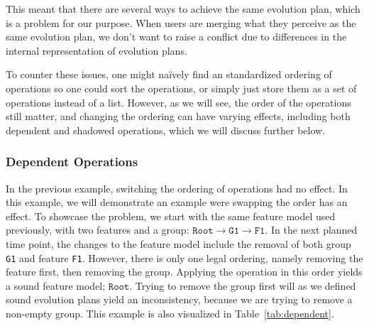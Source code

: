 \documentclass[a4paper,english]{ifimaster}
\begin{document}
This meant that there are several ways to achieve the same evolution plan, which is a problem for our purpose. When users are merging what they perceive as the same evolution plan, we don't want to raise a conflict due to differences in the internal representation of evolution plans.

To counter these issues, one might naïvely find an standardized ordering of operations so one could sort the operations, or simply just store them as a set of operations instead of a list. However, as we will see, the order of the operations still matter, and changing the ordering can have varying effects, including both dependent and shadowed operations, which we will discuss further below.

\subsubsection{Dependent Operations}%
\label{ssub:dependent_operations}

In the previous example, switching the ordering of operations had no effect. In this example, we will demonstrate an example were swapping the order has an effect. To showcase the problem, we start with the same feature model used previously, with two features and a group: $\texttt{Root} \rightarrow \texttt{G1} \rightarrow \texttt{F1}$. In the next planned time point, the changes to the feature model include the removal of both group \texttt{G1} and feature \texttt{F1}. However, there is only one legal ordering, namely removing the feature first, then removing the group. Applying the operation in this order yields a sound feature model; $\texttt{Root}$. Trying to remove the group first will as we defined sound evolution plans yield an inconsistency, because we are trying to remove a non-empty group. This example is also visualized in Table~\ref{tab:dependent}.
\end{document}
